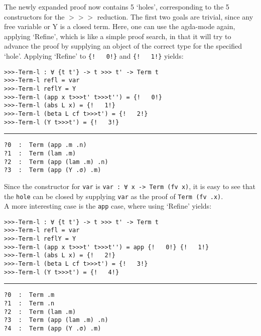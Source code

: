 \documentclass[a4paper, 12pt, twoside]{style/ociamthesis}
\theoremstyle{plain}
\theoremstyle{definition}
\theoremstyle{remark}
\begin{document}
The newly expanded proof now contains 5 `holes', corresponding to the 5
constructors for the \(>>>\) reduction. The first two goals are trivial,
since any free variable or Y is a closed term. Here, one can use the
agda-mode again, applying `Refine', which is like a simple proof search,
in that it will try to advance the proof by supplying an object of the
correct type for the specified `hole'. Applying `Refine' to
\texttt{\{!\ \ \ 0!\}} and \texttt{\{!\ \ \ 1!\}} yields:

\begin{verbatim}
>>>-Term-l : ∀ {t t'} -> t >>> t' -> Term t
>>>-Term-l refl = var
>>>-Term-l reflY = Y
>>>-Term-l (app x t>>>t' t>>>t'') = {!   0!}
>>>-Term-l (abs L x) = {!   1!}
>>>-Term-l (beta L cf t>>>t') = {!   2!}
>>>-Term-l (Y t>>>t') = {!   3!}
\end{verbatim}

\noindent\rule{8cm}{0.4pt}

\begin{verbatim}
?0  :  Term (app .m .n)
?1  :  Term (lam .m)
?2  :  Term (app (lam .m) .n)
?3  :  Term (app (Y .σ) .m)
\end{verbatim}

Since the constructor for \texttt{var} is
\texttt{var : ∀ {x} -> Term (fv x)}, it is easy to see that the
\texttt{hole} can be closed by supplying \texttt{var} as the proof of
\texttt{Term (fv .x)}.\\
A more interesting case is the \texttt{app} case, where using `Refine'
yields:

\begin{verbatim}
>>>-Term-l : ∀ {t t'} -> t >>> t' -> Term t
>>>-Term-l refl = var
>>>-Term-l reflY = Y
>>>-Term-l (app x t>>>t' t>>>t'') = app {!   0!} {!   1!}
>>>-Term-l (abs L x) = {!   2!}
>>>-Term-l (beta L cf t>>>t') = {!   3!}
>>>-Term-l (Y t>>>t') = {!   4!}
\end{verbatim}

\noindent\rule{8cm}{0.4pt}

\begin{verbatim}
?0  :  Term .m
?1  :  Term .n
?2  :  Term (lam .m)
?3  :  Term (app (lam .m) .n)
?4  :  Term (app (Y .σ) .m)
\end{verbatim}
\end{document}
